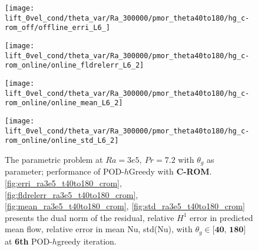 \begin{figure}[h!]
    \begin{minipage}[b]{.25\linewidth}
        \centering \texttt{[image: lift\_0vel\_cond/theta\_var/Ra\_300000/pmor\_theta40to180/hg\_c-rom\_off/offline\_erri\_L6\_]}
        \label{fig:erri_ra3e5_t40to180_crom}
    \end{minipage}%
    \begin{minipage}[b]{.25\linewidth}
        \centering \texttt{[image: lift\_0vel\_cond/theta\_var/Ra\_300000/pmor\_theta40to180/hg\_c-rom\_online/online\_fldrelerr\_L6\_2]}
        \label{fig:fldrelerr_ra3e5_t40to180_crom}
    \end{minipage}
    \begin{minipage}[b]{.25\linewidth}
        \centering \texttt{[image: lift\_0vel\_cond/theta\_var/Ra\_300000/pmor\_theta40to180/hg\_c-rom\_online/online\_mean\_L6\_2]}
        \label{fig:mean_ra3e5_t40to180_crom}
    \end{minipage}%
    \begin{minipage}[b]{.25\linewidth}
        \centering \texttt{[image: lift\_0vel\_cond/theta\_var/Ra\_300000/pmor\_theta40to180/hg\_c-rom\_online/online\_std\_L6\_2]}
        \label{fig:std_ra3e5_t40to180_crom}
    \end{minipage} 
    \caption{The parametric problem at $Ra=3e5,~Pr=7.2$ with $\theta_g$ as
    parameter; performance of POD-$h$Greedy with \textbf{C-ROM}.  \ref{fig:erri_ra3e5_t40to180_crom},
    \ref{fig:fldrelerr_ra3e5_t40to180_crom}, \ref{fig:mean_ra3e5_t40to180_crom}, \ref{fig:std_ra3e5_t40to180_crom}
    presents the dual norm of the residual, relative $H^1$ error in predicted
    mean flow, relative error in mean Nu, std(Nu), with $\theta_g \in
    \textbf{[40,~180]}$ at \textbf{6th} POD-$h$greedy iteration.}
    \label{fig:online_ra3e5_t40to180_crom} 
\end{figure}

